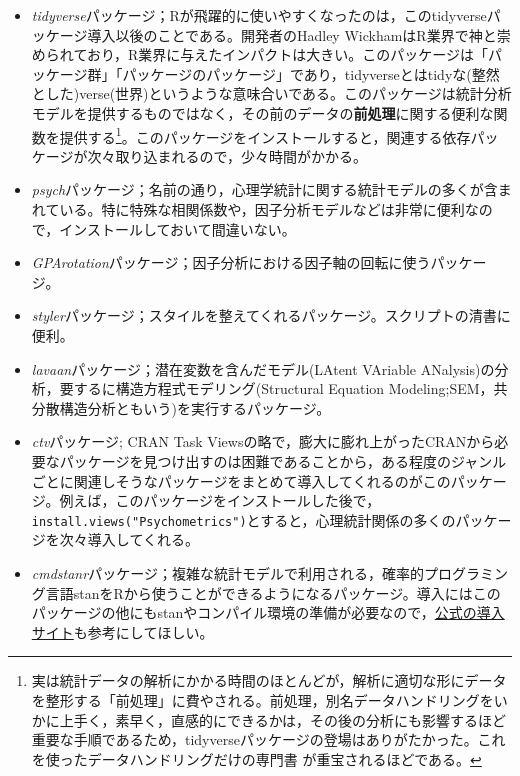 \documentclass[
  a4paper,
]{ltjsbook}
\providecommand{\tightlist}{%
  \setlength{\itemsep}{0pt}\setlength{\parskip}{0pt}}\usepackage{longtable,booktabs,array}
\begin{document}
\begin{itemize}
\tightlist
\item
  \emph{tidyverse}パッケージ\autocite{tidyverse}；Rが飛躍的に使いやすくなったのは，このtidyverseパッケージ導入以後のことである。開発者のHadley
  WickhamはR業界で神と崇められており，R業界に与えたインパクトは大きい。このパッケージは「パッケージ群」「パッケージのパッケージ」であり，tidyverseとはtidyな(整然とした)verse(世界)というような意味合いである。このパッケージは統計分析モデルを提供するものではなく，その前のデータの\textbf{前処理}に関する便利な関数を提供する\footnote{実は統計データの解析にかかる時間のほとんどが，解析に適切な形にデータを整形する「前処理」に費やされる。前処理，別名データハンドリングをいかに上手く，素早く，直感的にできるかは，その後の分析にも影響するほど重要な手順であるため，tidyverseパッケージの登場はありがたかった。これを使ったデータハンドリングだけの専門書
    \textcite{Kinosady2021} が重宝されるほどである。}。このパッケージをインストールすると，関連する依存パッケージが次々取り込まれるので，少々時間がかかる。
\item
  \emph{psych}パッケージ\autocite{psych}；名前の通り，心理学統計に関する統計モデルの多くが含まれている。特に特殊な相関係数や，因子分析モデルなどは非常に便利なので，インストールしておいて間違いない。
\item
  \emph{GPArotation}パッケージ\autocite{GPArotation}；因子分析における因子軸の回転に使うパッケージ。
\item
  \emph{styler}パッケージ；スタイルを整えてくれるパッケージ。スクリプトの清書に便利。
\item
  \emph{lavaan}パッケージ\autocite{lavaan}；潜在変数を含んだモデル(LAtent
  VAriable ANalysis)の分析，要するに構造方程式モデリング(Structural
  Equation Modeling;SEM，共分散構造分析ともいう)を実行するパッケージ。
\item
  \emph{ctv}パッケージ\autocite{CTV}; CRAN Task
  Viewsの略で，膨大に膨れ上がったCRANから必要なパッケージを見つけ出すのは困難であることから，ある程度のジャンルごとに関連しそうなパッケージをまとめて導入してくれるのがこのパッケージ。例えば，このパッケージをインストールした後で，\texttt{install.views("Psychometrics")}とすると，心理統計関係の多くのパッケージを次々導入してくれる。
\item
  \emph{cmdstanr}パッケージ\autocite{cmdstanr}；複雑な統計モデルで利用される，確率的プログラミング言語stanをRから使うことができるようになるパッケージ。導入にはこのパッケージの他にもstanやコンパイル環境の準備が必要なので，\href{https://mc-stan.org/cmdstanr/articles/cmdstanr.html}{公式の導入サイト}も参考にしてほしい。
\end{itemize}
\end{document}
